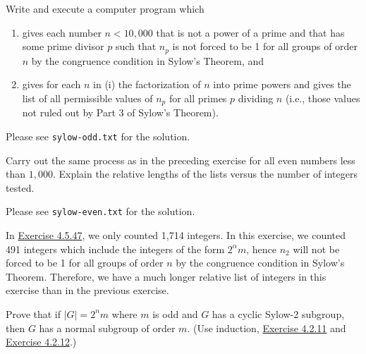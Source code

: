 \begin{exercise}\label{ex4.5.47}
	Write and execute a computer program which
	\begin{enumerate}
		\item[(i)] gives each number $n < 10,000$ that is not a power of a prime and that has some prime divisor $p$ such that $n_p$ is not forced to be 1 for all groups of order $n$ by the congruence condition in Sylow's Theorem, and
		\item[(ii)] gives for each $n$ in (i) the factorization of $n$ into prime powers and gives the list of all permissible values of $n_p$ for all primes $p$ dividing $n$ (i.e., those values not ruled out by Part 3 of Sylow's Theorem).
	\end{enumerate}
\end{exercise}

\begin{sol}
	Please see \verb|sylow-odd.txt| for the solution.
\end{sol}

\begin{exercise}\label{ex4.5.48}
	Carry out the same process as in the preceding exercise for all even numbers less than $1,000$. Explain the relative lengths of the lists versus the number of integers tested.
\end{exercise}

\begin{sol}
	Please see \verb|sylow-even.txt| for the solution.

	In \hyperref[ex4.5.47]{Exercise 4.5.47}, we only counted 1,714 integers. In this exercise, we counted 491 integers which include the integers of the form $2^\alpha m$, hence $n_2$ will not be forced to be 1 for all groups of order $n$ by the congruence condition in Sylow's Theorem. Therefore, we have a much longer relative list of integers in this exercise than in the previous exercise.
\end{sol}

\begin{exercise}\label{ex4.5.49}
	Prove that if $|G| = 2^nm$ where $m$ is odd and $G$ has a cyclic Sylow-2 subgroup, then $G$ has a normal subgroup of order $m$. (Use induction, \hyperref[ex4.2.11]{Exercise 4.2.11} and \hyperref[ex4.2.12]{Exercise 4.2.12}.)
\end{exercise}

